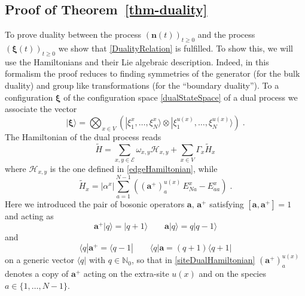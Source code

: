 \documentclass[10pt]{article}
\numberwithin{equation}{section}
\numberwithin{equation}{subsection}
\newcommand{\dt}{\;.}
\begin{document}
\subsection{Proof of Theorem~\ref{thm-duality}}
\label{proof-th-duality}
To prove duality between the process $(\bm{n}(t))_{t\geq 0}$ and the process  $(\bm{\xi}(t))_{t\geq 0}$ we  show that \eqref{DualityRelation} is fulfilled.  To show this, we will use the Hamiltonians and their Lie algebraic description. Indeed, in this formalism the proof
reduces to finding symmetries of the generator (for the bulk duality) and group like transformations (for the ``boundary duality'').
To a configuration $\bm{\xi}$ of the configuration space  \eqref{dualStateSpace} of a dual process we associate the vector
\begin{equation}
    |\bm{\xi}\rangle=\bigotimes_{x\in V}\left(|\xi_{1}^{x},\ldots,\xi_{N}^{x}\rangle\otimes |\xi_{1}^{u(x)},\ldots,\xi_{N}^{u(x)}\rangle\right)\dt
\end{equation}
The Hamiltonian of the dual process reads
\begin{equation}\label{DualHamiltonian}
    \widetilde{H}=\sum_{x,y\in \mathcal{E}}\omega_{x,y}\mathcal{H}_{x,y}+\sum_{x\in V}\Gamma_{x}\widetilde{H}_{x}
\end{equation}
where $\mathcal{H}_{x,y}$ is the one defined in \eqref{edgeHamiltonian}, while 
\begin{equation}\label{siteDualHamiltonian}
    \widetilde{H}_{x}=|\alpha^{x}|\sum_{a=1}^{N-1}\left((\mathbf{a}^{+})_{a}^{u(x)}\,E_{Na}^{x}-E_{aa}^{x}\right)\dt
\end{equation}
Here we introduced the pair of bosonic operators $\mathbf{a},\,\mathbf{a}^{+}$ satisfying $[\mathbf{a},\mathbf{a}^{+}]=1$ and acting as
\begin{equation}
	\mathbf{a}^{+}|q\rangle=|q+1\rangle\qquad \mathbf{a}|q\rangle=q|q-1\rangle
\end{equation}
and 
\begin{equation}
	\langle q|\mathbf{a}^{+}=\langle q-1|\qquad \langle q|\mathbf{a}=(q+1) \langle q+1|
\end{equation}
on a generic vector $\langle q|$ with $q\in \mathbb{N}_{0}$, so that in \eqref{siteDualHamiltonian} 
$(\mathbf{a}^{+})_{a}^{u(x)}$ denotes a copy of $\mathbf{a}^{+}$ acting on the extra-site $u(x)$ and on the species $a\in\{1,\ldots,N-1\}$. \\
\end{document}
